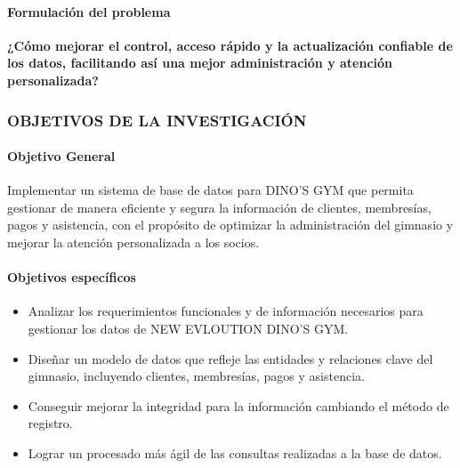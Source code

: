\documentclass[12pt, letterpaper]{article}
\begin{document}
\paragraph{Formulación del problema}
\textbf{¿Cómo mejorar el control, acceso rápido y la actualización confiable de los datos, facilitando así una mejor administración y atención personalizada?}\\
\subsubsection{OBJETIVOS DE LA INVESTIGACIÓN}
\paragraph{Objetivo General}
Implementar un sistema de base de datos para DINO'S GYM que permita gestionar de manera eficiente y segura la información de clientes, membresías, pagos y asistencia, con el propósito de optimizar la administración del gimnasio y mejorar la atención personalizada a los socios.\\
\paragraph{Objetivos específicos}
\begin{itemize}
    \item Analizar los requerimientos funcionales y de información necesarios para gestionar los datos de NEW EVLOUTION DINO'S GYM.
    \item Diseñar un modelo de datos que refleje las entidades y relaciones clave del gimnasio, incluyendo clientes, membresías, pagos y asistencia.
    \item Conseguir mejorar la integridad para la información cambiando el método de registro.
    \item Lograr un procesado más ágil de las consultas realizadas a la base de datos.
\end{itemize}
\newpage
\end{document}
